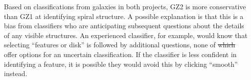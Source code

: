 \documentclass[useAMS,usenatbib]{mn2e}
\providecommand{\DIFdeltex}[1]{{\protect\color{red}\sout{#1}}}                      %
\providecommand{\DIFdelbegin}{} %
\providecommand{\DIFdelend}{} %
\providecommand{\DIFdel}[1]{\texorpdfstring{\DIFdeltex{#1}}{}} %
\begin{document}
Based on classifications from galaxies in both projects, GZ2 is more conservative than GZ1 at identifying spiral structure. A possible explanation is that this is a bias from classifiers who are anticipating subsequent questions about the details of any visible structures. An experienced classifier, for example, would know that selecting ``features or disk'' is followed by additional questions, none of \DIFdelbegin \DIFdel{which }\DIFdelend offer options for an uncertain classification. If the classifier is less confident in identifying a feature, it is possible they would avoid this by clicking ``smooth'' instead. %


\end{document}
